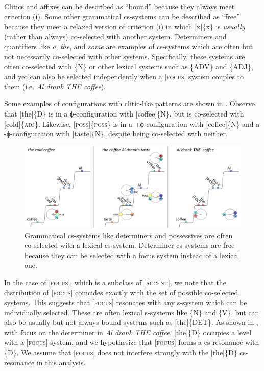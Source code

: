   Clitics and affixes can be described as “bound” because they always meet criterion (i). Some other grammatical cs-systems can be described as “free” because they meet a relaxed version of criterion (i) in which [x]\{x\} is \textit{usually} (rather than always) co-selected with another system. Determiners and quantifiers like \textit{a}, \textit{the}, and \textit{some} are examples of cs-systems which are often but not necessarily co-selected with other systems. Specifically, these systems are often co-selected with \{N\} or other lexical systems such as \{A\textsc{DV}\} and \{A\textsc{DJ}\}, and yet can also be selected independently when a [\textsc{focus}] system couples to them (i.e. \textit{Al drank THE coffee}).

  Some examples of configurations with clitic-like patterns are shown in {}. Observe that [the]\{\textsc{D}\} is in a ϕ-configuration with [coffee]\{N\}, but is co-selected with [cold]\{\textsc{adj}\}. Likewise, [\textsc{poss}]\{\textsc{poss}\} is in a +ϕ-configuration with [coffee]\{N\} and a -ϕ-configuration with [taste]\{N\}, despite being co-selected with neither. 

  
\begin{figure}
\includegraphics[width=\textwidth]{figures/Tilsen-img68.png}
\caption{Grammatical cs-systems like determiners and possessives are often co-selected with a lexical cs-system. Determiner cs-systems are free because they can be selected with a focus system instead of a lexical one.}
\label{fig:4:18}
\end{figure}
 

  In the case of [\textsc{focus}], which is a subclass of [\textsc{accent}], we note that the distribution of [\textsc{focus}] coincides exactly with the set of possible co-selected systems. This suggests that [\textsc{focus}] resonates with any s-system which can be individually selected. These are often lexical s-systems like \{N\} and \{V\}, but can also be usually-but-not-always bound systems such as [the]\{DET\}. As shown in {}, with focus on the determiner in \textit{Al drank THE coffee}, [the]\{D\} occupies a level with a [\textsc{focus}] system, and we hypothesize that [\textsc{focus}] forms a cs-resonance with \{D\}. We assume that [\textsc{focus}] does not interfere strongly with the [the]\{D\} cs-resonance in this analysis.

